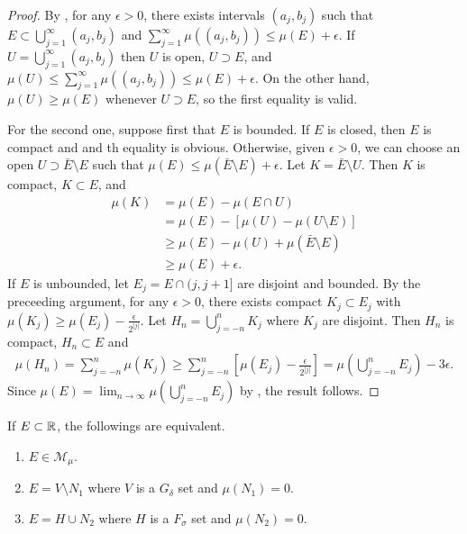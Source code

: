 \begin{proof}
    By , for any $\epsilon > 0$, there exists intervals $(a_j, b_j)$ such that $E \subset \bigcup_{j=1}^{\infty} (a_j, b_j)$ and $\sum_{j=1}^{\infty} \mu((a_j, b_j)) \le \mu(E) + \epsilon$.
    If $U = \bigcup_{j=1}^{\infty} (a_j, b_j)$ then $U$ is open, $U \supset E$, and $\mu(U) \le \sum_{j=1}^{\infty} \mu((a_j, b_j)) \le \mu(E) + \epsilon$.
    On the other hand, $\mu(U) \ge \mu(E)$ whenever $U \supset E$, so the first equality is valid.

    For the second one, suppose first that $E$ is bounded.
    If $E$ is closed, then $E$ is compact and and th equality is obvious.
    Otherwise, given $\epsilon > 0$, we can choose an open $U \supset \bar{E} \setminus E$ such that $\mu(E) \le \mu(\bar{E} \setminus E) + \epsilon$.
    Let $K = \bar{E} \setminus U$.
    Then $K$ is compact, $K \subset E$, and
    \begin{align}
        \mu(K) & = \mu(E) - \mu(E \cap U) \\
        & = \mu(E) - [\mu(U) - \mu(U \setminus E)] \\
        & \ge \mu(E) - \mu(U) + \mu(\bar{E} \setminus E) \\
        & \ge \mu(E) + \epsilon.
    \end{align}
    If $E$ is unbounded, let $E_j = E \cap (j, j+1]$ are disjoint and bounded.
    By the preceeding argument, for any $\epsilon > 0$, there exists compact $K_j \subset E_j$ with $\mu(K_j) \ge \mu(E_j) - \frac{\epsilon}{2^{|j|}}$.
    Let $H_n = \bigcup_{j=-n}^{n} K_j$ where $K_j$ are disjoint.
    Then $H_n$ is compact, $H_n \subset E$ and 
    \begin{align}
        \mu(H_n) = \sum_{j=-n}^{n} \mu(K_j) \ge \sum_{j=-n}^{n} \left[ \mu(E_j) - \frac{\epsilon}{2^{|j|}} \right] = \mu(\bigcup_{j=-n}^{n} E_j) - 3\epsilon.   
    \end{align}
    Since $\mu(E) = \lim_{n \to \infty} \mu(\bigcup_{j=-n}^{n} E_j)$ by , the result follows.
\end{proof}

\begin{theorem}
    If $E \subset \mathbb{R}$, the followings are equivalent.
    \begin{enumerate}
        \item $E \in \mathcal{M}_{\mu}$.
        \item $E = V \setminus N_1$ where $V$ is a $G_{\delta}$ set and $\mu(N_1) = 0$.
        \item $E = H \cup N_2$ where $H$ is a $F_{\sigma}$ set and $\mu(N_2) = 0$.
    \end{enumerate}
\end{theorem}

